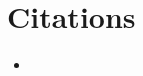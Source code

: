 \documentclass[11pt]{article}
\begin{document}
\section{Citations}

\begin{itemize}
\item 
\end{itemize}



\end{document}
